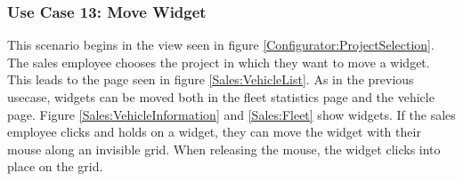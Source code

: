 \subsubsection{Use Case 13: Move Widget}

This scenario begins in the view seen in figure \ref{Configurator:ProjectSelection}. The sales employee chooses the project in which they want to move a widget. This leads to the page seen in figure \ref{Sales:VehicleList}. As in the previous \gls{usecase}, \glspl{widget} can be moved both in the fleet statistics page and the vehicle page. Figure \ref{Sales:VehicleInformation} and \ref{Sales:Fleet} show \glspl{widget}. If the sales employee clicks and holds on a widget, they can move the \gls{widget} with their mouse along an invisible grid. When releasing the mouse, the \gls{widget} clicks into place on the grid.
